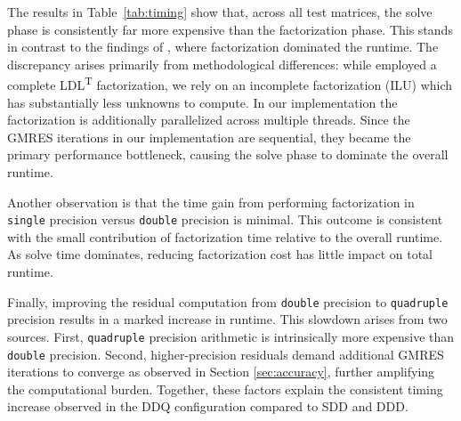 The results in Table~\ref{tab:timing} show that, across all test matrices, the
solve phase is consistently far more expensive than the factorization phase.
This stands in contrast to the findings of \textcite{wong_exploring_2024}, where
factorization dominated the runtime. The discrepancy arises primarily from
methodological differences: while \citeauthor{wong_exploring_2024} employed a
complete LDL\textsuperscript{T} factorization, we rely on an incomplete
factorization (ILU) which has substantially less unknowns to compute. In our
implementation the factorization is additionally parallelized across multiple
threads. Since the GMRES iterations in our implementation are sequential, they
became the primary performance bottleneck, causing the solve phase to dominate
the overall runtime.

Another observation is that the time gain from performing factorization in
\texttt{single} precision versus \texttt{double} precision is minimal. This
outcome is consistent with the small contribution of factorization time relative
to the overall runtime. As solve time dominates, reducing factorization cost has
little impact on total runtime.

Finally, improving the residual computation from \texttt{double} precision to
\texttt{quadruple} precision results in a marked increase in runtime. This
slowdown arises from two sources. First, \texttt{quadruple} precision arithmetic
is intrinsically more expensive than \texttt{double} precision. Second,
higher-precision residuals demand additional GMRES iterations to converge as
observed in Section \ref{sec:accuracy}, further amplifying the computational
burden. Together, these factors explain the consistent timing increase observed
in the DDQ configuration compared to SDD and DDD.
